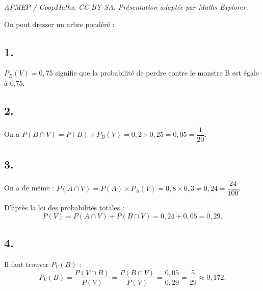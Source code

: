 \documentclass[10pt]{article}
\begin{document}
\noindent\textit{APMEP / CoopMaths. CC BY-SA. Présentation adaptée par Maths Explorer.}\par\medskip
On peut dresser un arbre pondéré :
	\begin{center}
\end{center}


	
	\subsection*{1.}
	
	\(P_B(V) = 0,75\) signifie que la probabilité de perdre contre le monstre B est égale à 0,75.
	
	\subsection*{2.}
	
	On a \(P(B \cap V) = P(B) \times P_B(V) = 0,2 \times 0,25 = 0,05 = \dfrac{1}{20}\).
	
	\subsection*{3.}
	
	On a de même : \(P(A \cap V) = P(A) \times P_A(V) = 0,8 \times 0,3 = 0,24 = \dfrac{24}{100}\).
	
	D'après la loi des probabilités totales :
	\[
	P(V) = P(A \cap V) + P(B \cap V) = 0,24 + 0,05 = 0,29.
	\]
	
	\subsection*{4.}
	
	Il faut trouver \(P_V(B)\) :
	\[
	P_V(B) = \dfrac{P(V \cap B)}{P(V)} = \dfrac{P(B \cap V)}{P(V)} = \dfrac{0,05}{0,29} = \dfrac{5}{29} \approx 0,172.
	\]
\end{document}

